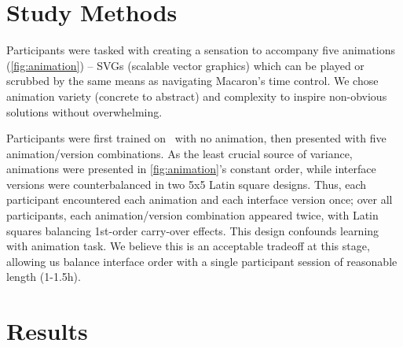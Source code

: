 %
%
\section{Study Methods}
Participants were tasked with creating a sensation to accompany five animations (\autoref{fig:animation}) -- SVGs (scalable vector graphics)  which can be played or scrubbed by the same means as navigating Macaron's time control.
We chose animation variety (concrete to abstract) and complexity to inspire non-obvious solutions without overwhelming.

Participants were first trained on \none\ with no animation,
then presented with five animation/version combinations.
As the least crucial source of variance, animations were presented in \autoref{fig:animation}'s constant order, while 
interface versions were counterbalanced in two 5x5 Latin square designs.
Thus, each participant encountered each animation and each interface version once; over all participants, each animation/version combination appeared twice,
with Latin squares balancing 1st-order carry-over effects.
This design confounds learning with animation task. 
We believe this is an acceptable tradeoff at this stage, allowing us balance interface order with a single participant session of reasonable length (1-1.5h).




%
%
\section{Results}
 
